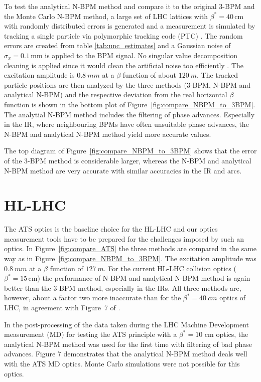 To test the analytical N-BPM method and compare it to the original 3-BPM and the Monte Carlo N-BPM
method, a large set of LHC lattices with $ \beta^*=40\,\text{cm} $ with randomly distributed errors
is generated and a measurement is simulated by tracking a single particle via polymorphic tracking
code (PTC) \cite{Schmidt2002}. The random errors are created from table \ref{tab:unc_estimates}
and a Gaussian noise of $ \sigma_x = 0.1\,\text{mm} $ is applied to the BPM signal. No singular value
decomposition cleaning is applied since it would clean the artificial noise too efficiently
\cite{Langner2016}. The excitation amplitude is $\SI{0.8}{mm}$ at a $ \beta $ function of about
$ \SI{120}{m} $. The tracked particle positions are then analyzed by the three methods
(3-BPM, N-BPM and analytical N-BPM) and the respective deviation from the real horizontal
$ \beta $ function is shown in the bottom plot of Figure~\ref{fig:compare_NBPM_to_3BPM}.
The analytial N-BPM method includes the filtering of phase advances. Especially in the IR, where
neighbouring BPMs have often unsuitable phase advances, the N-BPM and analytical N-BPM method yield
more accurate values.

The top diagram of Figure~\ref{fig:compare_NBPM_to_3BPM} shows that the error of the 3-BPM method is considerable larger, whereas the N-BPM and analytical N-BPM method are very accurate with similar accuracies in the IR and arcs.


\section{HL-LHC}
\label{sec_hllhc_nbpm}
The ATS optics \cite{Fartoukh2013} is the baseline choice for the HL-LHC and our optics measurement
tools have to be prepared for the challenges imposed by such an optics. In Figure~\ref{fig:compare_ATS}
the three methods are compared in the same way as in Figure~\ref{fig:compare_NBPM_to_3BPM}.
The excitation amplitude was $ \SI{0.8}{mm} $ at a $ \beta $ function of $ \SI{127}{m} $.
For the current HL-LHC collision optics ($ \beta^* =15\,\text{cm}$) the performance of N-BPM and
analytical N-BPM method is again better than the 3-BPM method, especially in the IRs. All three
methods are, however, about a factor two more inaccurate than for the $ \beta^*=\SI{40}{cm} $ optics
of LHC, in agreement with Figure~7 of \cite{LangnerNBPM}.

In the post-processing of the data taken during the LHC Machine Development
measurement (MD) \cite{mdpubl} for testing the ATS principle with a $ \beta^* = 10$ cm optics, the analytical N-BPM method was used for the first time with filtering of bad phase advances. Figure 7 demonstrates that the analytical N-BPM
method deals well with the ATS MD optics. Monte Carlo simulations were
not possible for this optics.

